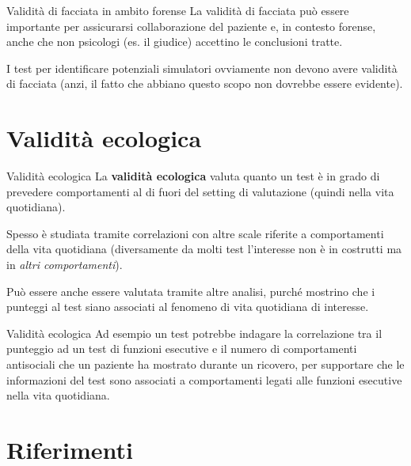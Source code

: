 \documentclass[
  ignorenonframetext,
]{beamer}
\begin{document}
\begin{frame}{Validità di facciata in ambito forense}
\label{validituxe0-di-facciata-in-ambito-forense}
La validità di facciata può essere importante per assicurarsi
collaborazione del paziente e, in contesto forense, anche che non
psicologi (es. il giudice) accettino le conclusioni tratte.

I test per identificare potenziali simulatori ovviamente non devono
avere validità di facciata (anzi, il fatto che abbiano questo scopo non
dovrebbe essere evidente).
\end{frame}

\section{Validità ecologica}\label{validituxe0-ecologica}

\begin{frame}{Validità ecologica}
\label{validituxe0-ecologica-1}
La \textbf{validità ecologica} valuta quanto un test è in grado di
prevedere comportamenti al di fuori del setting di valutazione (quindi
nella vita quotidiana).

Spesso è studiata tramite correlazioni con altre scale riferite a
comportamenti della vita quotidiana (diversamente da molti test
l'interesse non è in costrutti ma in \emph{altri comportamenti}).

Può essere anche essere valutata tramite altre analisi, purché mostrino
che i punteggi al test siano associati al fenomeno di vita quotidiana di
interesse.
\end{frame}

\begin{frame}{Validità ecologica}
\label{validituxe0-ecologica-2}
Ad esempio un test potrebbe indagare la correlazione tra il punteggio ad
un test di funzioni esecutive e il numero di comportamenti antisociali
che un paziente ha mostrato durante un ricovero, per supportare che le
informazioni del test sono associati a comportamenti legati alle
funzioni esecutive nella vita quotidiana.
\end{frame}

\section{Riferimenti}\label{riferimenti}
\end{document}
